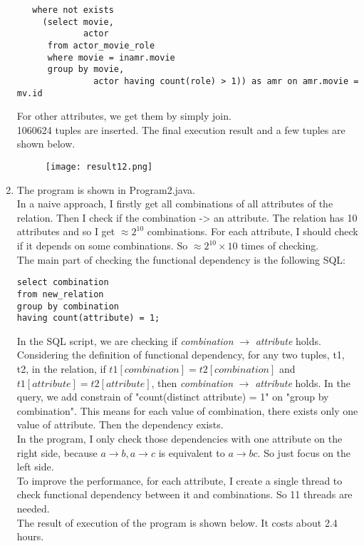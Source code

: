 \documentclass[a4paper]{article}
\begin{document}
\begin{enumerate}
\begin{lstlisting}
   where not exists
     (select movie,
             actor
      from actor_movie_role
      where movie = inamr.movie
      group by movie,
               actor having count(role) > 1)) as amr on amr.movie = mv.id
\end{lstlisting}
For other attributes, we get them by simply join.\\
1060624 tuples are inserted. The final execution result and a few tuples are shown below.
\begin{figure}[H]
\centering
\texttt{[image: result12.png]}
\end{figure}






\item
The program is shown in Program2.java.\\
In a naive approach, I firstly get all combinations of all attributes of the relation. Then I check if the combination -> an attribute. The relation has 10 attributes and so I get $\approx 2^10$ combinations. For each attribute, I should check if it depends on some combinations. So $\approx 2^10\times 10$ times of checking.\\
The main part of checking the functional dependency is the following SQL:
\begin{lstlisting}
select combination
from new_relation
group by combination 
having count(attribute) = 1;
\end{lstlisting}
In the SQL script, we are checking if \textsl{combination} $\rightarrow$ \textsl{attribute} holds. Considering the definition of functional dependency, for any two tuples, t1, t2, in the relation, if $t1[combination] = t2[combination]$ and $t1[attribute] = t2[attribute]$, then \textsl{combination} $\rightarrow$ \textsl{attribute} holds. In the query, we add constrain of "count(distinct attribute) = 1" on "group by combination". This means for each value of combination, there exists only one value of attribute. Then the dependency exists.\\
In the program, I only check those dependencies with one attribute on the right side, because $a \rightarrow b, a \rightarrow c$ is equivalent to $a \rightarrow bc$. So just focus on the left side.\\
To improve the performance, for each attribute, I create a single thread to check functional dependency between it and combinations. So 11 threads are needed.\\
The result of execution of the program is shown below. It costs about 2.4 hours.\\

\end{enumerate}
\end{document}
